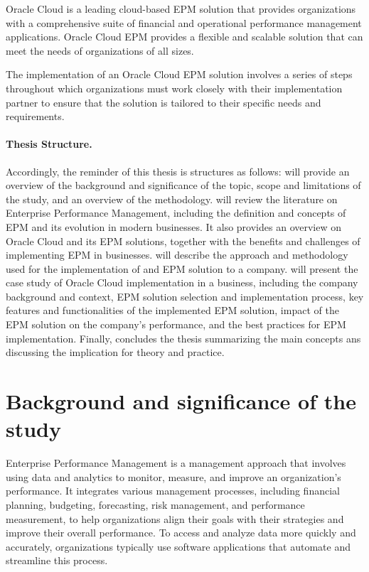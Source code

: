 \documentclass[12pt,a4paper,openright,twoside]{book}
\begin{document}
 Oracle Cloud is a leading cloud-based EPM solution that provides organizations with a comprehensive suite of financial and operational performance management applications.
Oracle Cloud EPM provides a flexible and scalable solution that can meet the needs of organizations of all sizes.

The implementation of an Oracle Cloud EPM solution involves a series of steps throughout which organizations must work closely with their implementation partner to ensure that the solution is tailored to their specific needs and requirements.

%
\paragraph{Thesis Structure.}
%

Accordingly, the reminder of this thesis is structures as follows:
%
 will provide an overview of the background and significance of the topic, scope and limitations of the study, and an overview of the methodology.
%
 will review the literature on Enterprise Performance Management, including the definition and concepts of EPM and its evolution in modern businesses. 
%
It also provides an overview on Oracle Cloud and its EPM solutions, together with the benefits and challenges of implementing EPM in businesses. 
%
 will describe the approach and methodology used for the implementation of and EPM solution to a company.
%
 will present the case study of Oracle Cloud implementation in a business, including the company background and context, EPM solution selection and implementation process, key features and functionalities of the implemented EPM solution, impact of the EPM solution on the company's performance, and the best practices for EPM implementation. 
%
Finally,  concludes the thesis summarizing the main concepts ans discussing the implication for theory and practice.

\section{Background and significance of the study}

Enterprise Performance Management is a management approach that involves using data and analytics to monitor, measure, and improve an organization's performance. 
%
It integrates various management processes, including financial planning, budgeting, forecasting, risk management, and performance measurement, to help organizations align their goals with their strategies and improve their overall performance.
%
To access and analyze data more quickly and accurately, organizations typically use software applications that automate and streamline this process.
\end{document}
